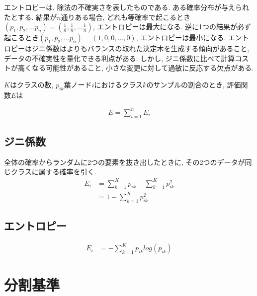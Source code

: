 \documentclass[dvipdfmx, 10pt]{jsarticle}
\begin{document}
エントロピーは, 除法の不確実さを表したものである. ある確率分布が与えられたとする. 
結果が\(n\)通りある場合, どれも等確率で起こるとき\((p_1, p_2, \dots p_n) = (\frac{1}{n}, \frac{1}{n}, \dots \frac{1}{n})\), 
エントロピーは最大になる. 
逆に1つの結果が必ず起こるとき\((p_1, p_2, \dots p_n) = (1, 0, 0, \dots ,0)\), エントロピーは最小になる. 
エントロピーはジニ係数はよりもバランスの取れた決定木を生成する傾向があること, データの不確実性を量化できる利点がある. 
しかし, ジニ係数に比べて計算コストが高くなる可能性があること, 小さな変更に対して過敏に反応する欠点がある. 

\begin{oframed}

\(K\)はクラスの数, \(p_{ik}\)葉ノード\(i\)におけるクラス\(k\)のサンプルの割合のとき, 評価関数\(E\)は

\begin{align*}
    E = \sum_{i=1}^{n} E_i
\end{align*}

\subsection*{ジニ係数}
全体の確率からランダムに2つの要素を抜き出したときに, その2つのデータが同じクラスに属する確率を引く. 
\begin{align*}
    E_i 
    &= \sum_{k=1}^{K} p_{ik} - \sum_{k=1}^{K} p_{ik}^2 \\
    &= 1 - \sum_{k=1}^{K} p_{ik}^2
\end{align*}

\subsection*{エントロピー}
\begin{align*}
    E_i
    &= - \sum_{k=1}^{K} p_{ik} log(p_{ik})
\end{align*}

\end{oframed}

\section*{分割基準}
\end{document}
